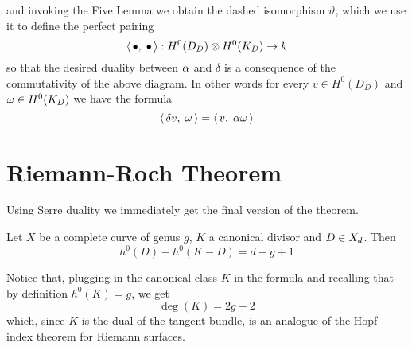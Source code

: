 	and invoking the Five Lemma we obtain the dashed isomorphism $\vartheta$, which we use it to define the perfect pairing
	$$ \langle\,\bullet,\;\bullet\,\rangle : H^0(D_D)\otimes H^0(K_D) \to k $$
	so that the desired duality between $\alpha$ and $\delta$ is a consequence of the commutativity of the above diagram. In other words for every $ v\in H^0(D_D)$ and $\omega\in H^0(K_D)$ we have the formula
	\begin{equation}\label{eq:deltalpha}
		\langle\, \delta v,\; \omega \,\rangle = \langle\, v,\; \alpha \omega \,\rangle
	\end{equation}

	
	
	
	
	
	
	
	
	
	

\section{Riemann-Roch Theorem}
	Using Serre duality we immediately get the final version of the theorem.
	\begin{namedtheo}[\RR Theorem]
		Let $X$ be a complete curve of genus $g$, $K$ a canonical divisor and $D\in X_d$. Then
		\begin{equation}\label{thm:RR}
			h^0(D) - h^0(K-D) = d-g+1
		\end{equation}
	\end{namedtheo}
	Notice that, plugging-in the canonical class $K$ in the \RR formula and recalling that by definition $h^0(K) = g$, we get
	$$ \deg(K) = 2g-2 $$
	which, since $K$ is the dual of the tangent bundle, is an analogue of the Hopf index theorem for Riemann surfaces.
